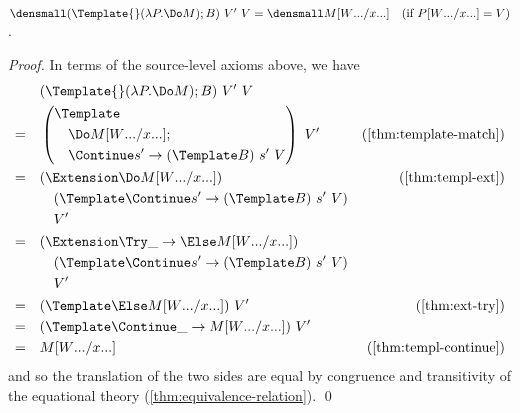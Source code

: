 \begin{lemma}
  \label{thm:template-do-match}

  $\den{(\Template{} (\lambda P. \Do M); B) ~ V' ~ V} = \den{M\subst{\many{x}}{\many{W}}}
  \quad (\text{if } P\subst{\many{x}}{\many{W}} = V)$.
\end{lemma}
\begin{proof}
  In terms of the source-level axioms above, we have
  \begin{align*}
    &\quad
    (\Template{} (\lambda P. \Do M); B) ~ V' ~ V
    \\
    =&\quad
    \left(
      \begin{aligned}
        &\Template \\
        &\quad \Do M\subst{\many{x}}{\many{W}}; \\
        &\quad \Continue s' \to (\Template B) ~ s' ~ V
      \end{aligned}
    \right)
    ~ V'
    &(\cref{thm:template-match})
    \\
    =&\quad
    \begin{aligned}[t]
      &(\Extension \Do M\subst{\many{x}}{\many{W}}) \\
      &\quad (\Template \Continue s' \to (\Template B) ~ s' ~ V) \\
      &\quad V'
    \end{aligned}
    &(\cref{thm:templ-ext})
    \\
    =&\quad
    \begin{aligned}[t]
      &(\Extension \Try \_ \to \Else M\subst{\many{x}}{\many{W}}) \\
      &\quad (\Template \Continue s' \to (\Template B) ~ s' ~ V) \\
      &\quad V'
    \end{aligned}
    \\
    =&\quad
    (\Template \Else M\subst{\many{x}}{\many{W}})
    ~ V'
    &(\cref{thm:ext-try})
    \\
    =&\quad
    (\Template \Continue \_ \to  M\subst{\many{x}}{\many{W}})
    ~ V'
    \\
    =&\quad
    M\subst{\many{x}}{\many{W}}    
    &(\cref{thm:templ-continue})
  \end{align*}
  and so the translation of the two sides are equal by congruence and transitivity of the equational theory (\cref{thm:equivalence-relation}).
  \qed

\end{proof}
